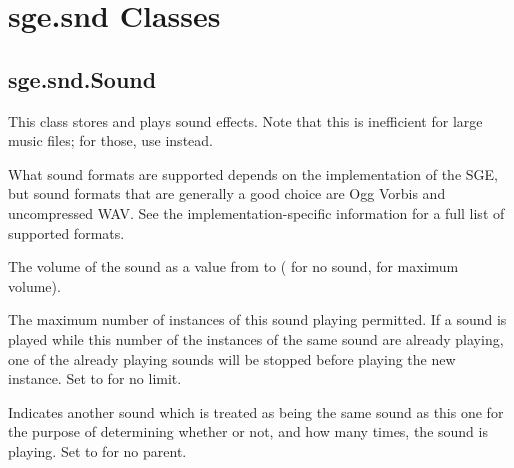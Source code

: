 \documentclass[letterpaper,10pt,english]{sphinxmanual}
\begin{document}
\section{sge.snd Classes}
\label{snd:sge-snd-classes}

\subsection{sge.snd.Sound}
\label{snd:sge-snd-sound}

\begin{fulllineitems}
\label{snd:sge.snd.Sound}
This class stores and plays sound effects.  Note that this is
inefficient for large music files; for those, use
{\hyperref[snd:sge.snd.Music]{\emph{}}} instead.

What sound formats are supported depends on the implementation of
the SGE, but sound formats that are generally a good choice are Ogg
Vorbis and uncompressed WAV.  See the implementation-specific
information for a full list of supported formats.

\begin{fulllineitems}
\label{snd:sge.snd.Sound.volume}
The volume of the sound as a value from  to  ( for
no sound,  for maximum volume).

\end{fulllineitems}


\begin{fulllineitems}
\label{snd:sge.snd.Sound.max_play}
The maximum number of instances of this sound playing permitted.
If a sound is played while this number of the instances of the
same sound are already playing, one of the already playing sounds
will be stopped before playing the new instance.  Set to
 for no limit.

\end{fulllineitems}


\begin{fulllineitems}
\label{snd:sge.snd.Sound.parent}
Indicates another sound which is treated as being the same sound
as this one for the purpose of determining whether or not, and
how many times, the sound is playing.  Set to  for
no parent.


\end{fulllineitems}
\end{fulllineitems}
\end{document}
